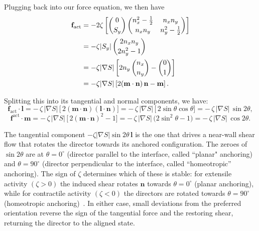 \documentclass[11pt]{article}
\begin{document}
Plugging back into our force equation, we then have
\begin{align}
\mathbf f_{\mathrm{act}}
&= -2\zeta\left[\begin{pmatrix} 0\\[2pt] S_y \end{pmatrix}
\begin{pmatrix} n_x^2-\tfrac{1}{2} & n_x n_y\\[2pt] n_x n_y & n_y^2-\tfrac{1}{2} \end{pmatrix}\right] \notag \\
&= -\zeta |S_y| \begin{pmatrix} 2n_x n_y\\[2pt] 2n_y^2 - 1 \end{pmatrix} \notag \\
&= -\zeta |\nabla S|\left[ 2n_y \begin{pmatrix} n_x\\[2pt] n_y \end{pmatrix}
- \begin{pmatrix} 0\\[2pt] 1 \end{pmatrix}\right] \notag \\
&= -\zeta |\nabla S| \left[ 2 (\mathbf{m}\cdot\mathbf{n})\,\mathbf{n} - \mathbf{m}\right].
\label{eq:fact_final}
\end{align}

Splitting this into its tangential and normal components, we have:
\begin{equation}
    \mathbf{f}_{\mathrm{act}}\!\cdot\!\mathbf{l} = -\,\zeta\,|\nabla S|\,\Big[\,2(\mathbf{m}\!\cdot\!\mathbf{n})(\mathbf{l}\!\cdot\!\mathbf{n})\Big] = -\,\zeta\,|\nabla S|\,\Big[\,2\sin \theta \cos \theta\Big] = -\,\zeta\,|\nabla S|\,\sin 2\theta, \end{equation}
\begin{equation}
    \mathbf{f}^{\mathrm{act}}\!\cdot\!\mathbf{m} = -\,\zeta\,|\nabla S|\,\Big[\,2(\mathbf{m}\!\cdot\!\mathbf{n})^{2}-1\Big] = -\,\zeta\,|\nabla S|\,\big(2\sin^{2}\theta-1\big) = -\,\zeta\,|\nabla S|\,\cos 2\theta.
\end{equation}

The tangential component $-\zeta|\nabla S|\sin 2\theta\,\mathbf{l}$ is the one that drives a near-wall shear flow that rotates the director towards its anchored configuration. The zeroes of $\sin 2\theta$ are at $\theta=0^\circ$ (director parallel to the interface, called ``planar" anchoring) and $\theta=90^\circ$ (director perpendicular to the interface, called “homeotropic” anchoring). The sign of $\zeta$ determines which of these is stable: for extensile activity $(\zeta>0)$ the induced shear rotates $\mathbf{n}$ towards $\theta=0^\circ$ (planar anchoring), while for contractile activity $(\zeta<0)$ the directors are rotated towards $\theta=90^\circ$ (homeotropic anchoring)~\cite{doostmohammadi2018active}. In either case, small deviations from the preferred orientation reverse the sign of the tangential force and the restoring shear, returning the director to the aligned state. 
\end{document}
